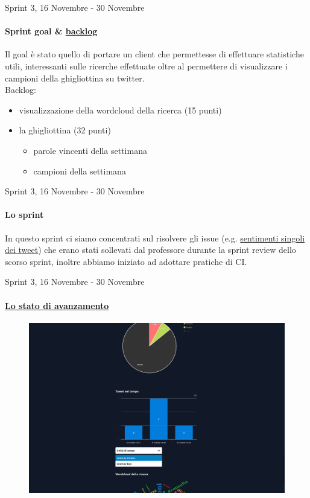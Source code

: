 \documentclass[12pt, aspectration=169]{beamer}
\begin{document}
\begin{frame}{Sprint 3, 16 Novembre - 30 Novembre}
\framesubtitle{Sprint goal \& \href{https://taiga.hjkl.gq/project/ingsw2022-team3/taskboard/sprint-3-6}{backlog}}
Il goal \`e stato quello di portare un client che permettesse di effettuare statistiche utili, interessanti sulle ricerche effettuate oltre al permettere di visualizzare i campioni della ghigliottina su twitter. \\
Backlog:
\begin{itemize}
    \item visualizzazione della wordcloud della ricerca (15 punti)
    \item la ghigliottina (32 punti)
    \begin{itemize}
        \item parole vincenti della settimana
        \item campioni della settimana
    \end{itemize}
\end{itemize}
\end{frame}
\begin{frame}{Sprint 3, 16 Novembre - 30 Novembre}
\framesubtitle{Lo sprint}
In questo sprint ci siamo concentrati sul risolvere gli issue (e.g. \href{https://taiga.hjkl.gq/project/ingsw2022-team3/issue/94}{sentimenti singoli dei tweet}) che erano stati sollevati dal professore durante la sprint review dello scorso sprint, inoltre abbiamo iniziato ad adottare pratiche di CI.
\end{frame}
\begin{frame}{Sprint 3, 16 Novembre - 30 Novembre}
\framesubtitle{\href{https://taiga.hjkl.gq/project/ingsw2022-team3/wiki/sprint-rw-512}{Lo stato di avanzamento}}
\begin{figure}[H]
    \centering
    \includegraphics[scale=0.15]{reviews/sprint_review1205.png}
    \label{fig:review3}
\end{figure}
\end{frame}
\end{document}
